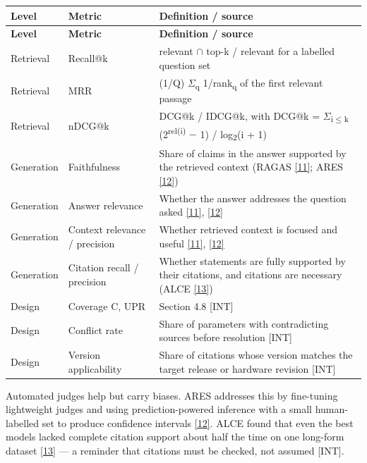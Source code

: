 \documentclass[11pt,a4paper]{article}
\newcommand{\prov}[1]{\textsf{\footnotesize[#1]}}
\begin{document}
{\small
\begin{longtable}{>{\raggedright\arraybackslash}p{}>{\raggedright\arraybackslash}p{}>{\raggedright\arraybackslash}p{}}
\toprule
\rowcolor{headbg} \textbf{Level} & \textbf{Metric} & \textbf{Definition / source} \\
\midrule
\endfirsthead
\toprule
\rowcolor{headbg} \textbf{Level} & \textbf{Metric} & \textbf{Definition / source} \\
\midrule
\endhead
\bottomrule
\endlastfoot
Retrieval & Recall@k & \textbar{}relevant \ensuremath{\cap} top-k\textbar{} / \textbar{}relevant\textbar{} for a labelled question set \\ \arrayrulecolor{rulec}\hline\arrayrulecolor{black}
Retrieval & MRR & (1/\textbar{}Q\textbar{}) \ensuremath{\Sigma}\textsubscript{q} 1/rank\textsubscript{q} of the first relevant passage \\ \arrayrulecolor{rulec}\hline\arrayrulecolor{black}
Retrieval & nDCG@k & DCG@k / IDCG@k, with DCG@k = \ensuremath{\Sigma}\textsubscript{i\ensuremath{\leq}k} (2\textsuperscript{rel(i)} \ensuremath{-} 1) / log\textsubscript{2}(i + 1) \\ \arrayrulecolor{rulec}\hline\arrayrulecolor{black}
Generation & Faithfulness & Share of claims in the answer supported by the retrieved context (RAGAS \hyperlink{ref11}{[11]}; ARES \hyperlink{ref12}{[12]}) \\ \arrayrulecolor{rulec}\hline\arrayrulecolor{black}
Generation & Answer relevance & Whether the answer addresses the question asked \hyperlink{ref11}{[11]}, \hyperlink{ref12}{[12]} \\ \arrayrulecolor{rulec}\hline\arrayrulecolor{black}
Generation & Context relevance / precision & Whether retrieved context is focused and useful \hyperlink{ref11}{[11]}, \hyperlink{ref12}{[12]} \\ \arrayrulecolor{rulec}\hline\arrayrulecolor{black}
Generation & Citation recall / precision & Whether statements are fully supported by their citations, and citations are necessary (ALCE \hyperlink{ref13}{[13]}) \\ \arrayrulecolor{rulec}\hline\arrayrulecolor{black}
Design & Coverage C, UPR & Section 4.8 \prov{INT} \\ \arrayrulecolor{rulec}\hline\arrayrulecolor{black}
Design & Conflict rate & Share of parameters with contradicting sources before resolution \prov{INT} \\ \arrayrulecolor{rulec}\hline\arrayrulecolor{black}
Design & Version applicability & Share of citations whose version matches the target release or hardware revision \prov{INT} \\
\end{longtable}
}
Automated judges help but carry biases. ARES addresses this by fine-tuning lightweight judges and using prediction-powered inference with a small human-labelled set to produce confidence intervals \hyperlink{ref12}{[12]}. ALCE found that even the best models lacked complete citation support about half the time on one long-form dataset \hyperlink{ref13}{[13]} --- a reminder that citations must be checked, not assumed \prov{INT}.
\end{document}
